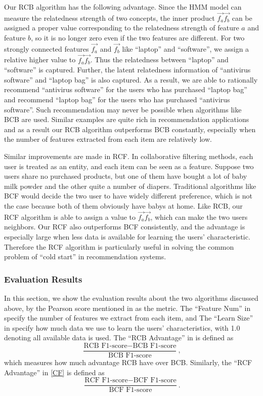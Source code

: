 Our RCB algorithm has the following advantage. 
Since the HMM model can measure the relatedness strength of two concepts, 
the inner product $\vec{f_a}\vec{f_b}$ can be assigned a proper value 
corresponding to the relatedness strength of feature $a$ and feature $b$, 
so it is no longer zero even if the two features are different. 
For two strongly connected features $\vec{f_a}$ and $\vec{f_b}$ 
like ``laptop'' and ``software'', we assign a relative higher value to 
$\vec{f_a}\vec{f_b}$. Thus the relatedness between ``laptop'' and 
``software'' is captured. Further, the latent relatedness information 
of ``antivirus software'' and ``laptop bag'' is also captured. 
As a result, we are able to rationally 
recommend ``antivirus software'' for the users who has purchased 
``laptop bag'' and recommend ``laptop bag'' for the users who has purchased 
``antivirus software''. Such recommendation may never be possible when 
algorithms like BCB are used. Similar examples are quite rich in 
recommendation applications and as a result our RCB algorithm outperforms 
BCB constantly, especially when the number of features extracted from 
each item are relatively low.

Similar improvements are made in RCF. In collaborative filtering methods, 
each user is treated as an entity, and each item can be seen as a feature. 
Suppose two users share no purchased products, but one of them have 
bought a lot of baby milk powder and the other quite a number of diapers. 
Traditional algorithms like BCF would decide the two user to have 
widely different preference, which is not the case because both of them 
obviously have babys at home.
Like RCB, our RCF algorithm is able to assign a value to 
$\vec{f_a}\vec{f_b}$, which can make the two users neighbors. 
Our RCF also outperforms BCF consistently, and the advantage is 
especially large when less data is available for learning 
the users' characteristic. 
Therefore the RCF algorithm is particularly useful in solving 
the common problem of ``cold start'' in recommendation systems.

\subsubsection{Evaluation Results}
In this section, we show the evaluation results about the 
two algorithms discussed above, by the Pearson score mentioned in 
 as the metric. 
The ``Feature Num'' in  specify the number of features 
we extract from each item, and The ``Learn Size'' in  
specify how much data we use to learn the users' characteristics, 
with 1.0 denoting all available data is used. The ``RCB Advantage'' in 
 is defined as 
\[\frac{\mbox{RCB F1-score} - \mbox{BCB F1-score}}{\mbox{BCB F1-score}},
\]
which measures how much advantage RCB have over BCB. Similarly, 
the ``RCF Advantage'' in \ref{CF} is defined as 
\[\frac{\mbox{RCF F1-score} - \mbox{BCF F1-score}}{\mbox{BCF F1-score}}.
\] 

